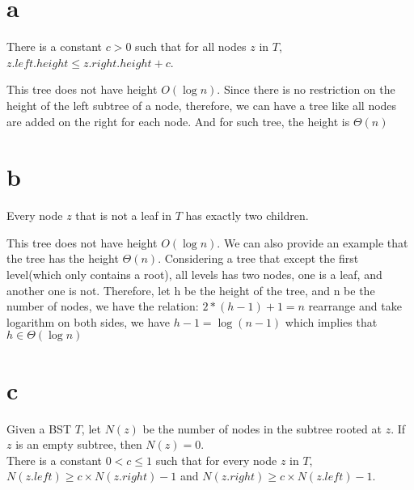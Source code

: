 \documentclass[12pt]{article}
\begin{document}
	\begin{enumerate}
		\part{a} There is a constant $c > 0$ such that for all nodes $z$ in $T$, $z.left.height \leq z.right.height + c$.
		
		This tree does not have height $O(\log n)$. Since there is no restriction on the height of the left subtree of a node, therefore, we can have a tree like all nodes are added on the right for each node. And for such tree, the height is $\Theta(n)$
		
		\part{b} Every node $z$ that is not a leaf in $T$ has exactly two children.
		
		This tree does not have height $O(\log n)$. We can also provide an example that the tree has the height $\Theta(n)$. Considering a tree that except the first level(which only contains a root), all levels has two nodes, one is a leaf, and another one is not. Therefore, let h be the height of the tree, and n be the number of nodes, we have the relation: $2*(h-1)+1=n$ rearrange and take logarithm on both sides, we have $h-1=\log(n-1)$ which implies that $h \in \Theta(\log n)$
		
		\part{c} Given a BST $T$, let $N(z)$ be the number of nodes in the subtree rooted at $z$.
		If $z$ is an empty subtree, then $N(z) = 0$. \\
		There is a constant $0 < c \leq 1$ such that for every node $z$ in $T$, $N(z.left) \geq c\times N(z.right) - 1$ and $N(z.right) \geq c\times N(z.left) - 1$.
		

\end{enumerate}
\end{document}
